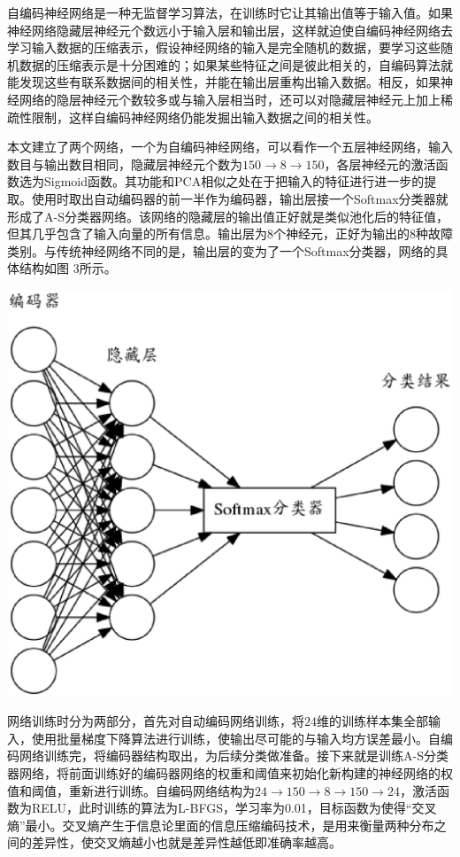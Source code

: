 \documentclass{ctacn}%
\begin{document}
\begin{multicols}{2}
自编码神经网络是一种无监督学习算法，在训练时它让其输出值等于输入值。如果神经网络隐藏层神经元个数远小于输入层和输出层，这样就迫使自编码神经网络去学习输入数据的压缩表示，假设神经网络的输入是完全随机的数据，要学习这些随机数据的压缩表示是十分困难的；如果某些特征之间是彼此相关的，自编码算法就能发现这些有联系数据间的相关性，并能在输出层重构出输入数据。相反，如果神经网络的隐层神经元个数较多或与输入层相当时，还可以对隐藏层神经元上加上稀疏性限制，这样自编码神经网络仍能发掘出输入数据之间的相关性。

本文建立了两个网络，一个为自编码神经网络，可以看作一个五层神经网络，输入数目与输出数目相同，隐藏层神经元个数为$150\rightarrow8\rightarrow150$，各层神经元的激活函数选为Sigmoid函数。其功能和PCA相似之处在于把输入的特征进行进一步的提取。使用时取出自动编码器的前一半作为编码器，输出层接一个Softmax分类器就形成了A-S分类器网络。该网络的隐藏层的输出值正好就是类似池化后的特征值，但其几乎包含了输入向量的所有信息。输出层为8个神经元，正好为输出的8种故障类别。与传统神经网络不同的是，输出层的变为了一个Softmax分类器，网络的具体结构如图
3所示。

\begin{center}
	\includegraphics[scale=0.12, trim=0 0 0 0]{figs/autoencoder_softmax}\\
	\label{fig4}
\end{center}

网络训练时分为两部分，首先对自动编码网络训练，将$24$维的训练样本集全部输入，使用批量梯度下降算法进行训练，使输出尽可能的与输入均方误差最小。自编码网络训练完，将编码器结构取出，为后续分类做准备。接下来就是训练A-S分类器网络，将前面训练好的编码器网络的权重和阈值来初始化新构建的神经网络的权值和阈值，重新进行训练。自编码网络结构为$24\rightarrow150\rightarrow8\rightarrow150\rightarrow24$，激活函数为RELU，此时训练的算法为L-BFGS，学习率为0.01，目标函数为使得“交叉熵”最小。交叉熵产生于信息论里面的信息压缩编码技术，是用来衡量两种分布之间的差异性，使交叉熵越小也就是差异性越低即准确率越高。


\end{multicols}
\end{document}

